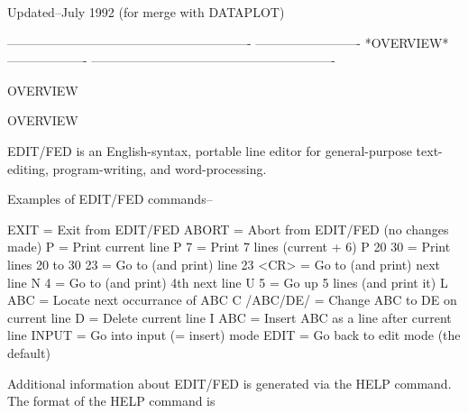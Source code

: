  
 
 
 
 
 
 
Updated--July 1992 (for merge with DATAPLOT)
 
 
 
 
 
 
 
 
 
 
 
 
 
 
 
 
 
 
 
 
 
 
 
 
 
 
 
 
 
 
 
 
 
 
 
 
 
 
 
 
 
 
 
 
 
 
 
----------------------------------------------------------
-------------------------  *OVERVIEW*  -------------------
----------------------------------------------------------
 
OVERVIEW
 
OVERVIEW
 
   EDIT/FED is an English-syntax, portable line editor
   for general-purpose text-editing, program-writing,
   and word-processing.
 
   Examples of EDIT/FED commands--
 
      EXIT       = Exit from EDIT/FED
      ABORT      = Abort from EDIT/FED (no changes made)
      P          = Print current line
      P 7        = Print 7 lines (current + 6)
      P 20 30    = Print lines 20 to 30
      23         = Go to (and print) line 23
      <CR>       = Go to (and print) next line
      N 4        = Go to (and print) 4th next line
      U 5        = Go up 5 lines (and print it)
      L ABC      = Locate next occurrance of ABC
      C /ABC/DE/ = Change ABC to DE on current line
      D          = Delete current line
      I ABC      = Insert ABC as a line after current line
      INPUT      = Go into input (= insert) mode
      EDIT       = Go back to edit mode (the default)
 
   Additional information about EDIT/FED is generated
   via the HELP command.  The format of the
   HELP command is
 
